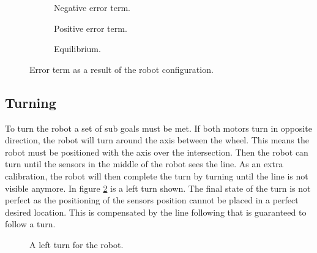 \begin{figure}
 \begin{subfigure}{0.32\textwidth}
 \centering
  \caption{Negative error term.}
 \end{subfigure}
 \begin{subfigure}{0.32\textwidth}
 \centering
  \caption{Positive error term.}
 \end{subfigure}
 \begin{subfigure}{0.32\textwidth}
 \centering
  \caption{Equilibrium.}
 \end{subfigure}
\caption{Error term as a result of the robot configuration.}
\label{fig:line_follow}
\end{figure}


\subsection{Turning}
To turn the robot a set of sub goals must be met.
If both motors turn in opposite direction, the robot will turn around the axis between the wheel.
This means the robot must be positioned with the axis over the intersection.
Then the robot can turn until the sensors in the middle of the robot sees the line.
As an extra calibration, the robot will then complete the turn by turning until the line is not visible anymore.
In figure \ref{fig:left_turn} is a left turn shown.
The final state of the turn is not perfect as the positioning of the sensors position cannot be placed in a perfect desired location.
This is compensated by the line following that is guaranteed to follow a turn.

\begin{figure}

 \caption{A left turn for the robot.}
 \label{fig:left_turn}
\end{figure}
